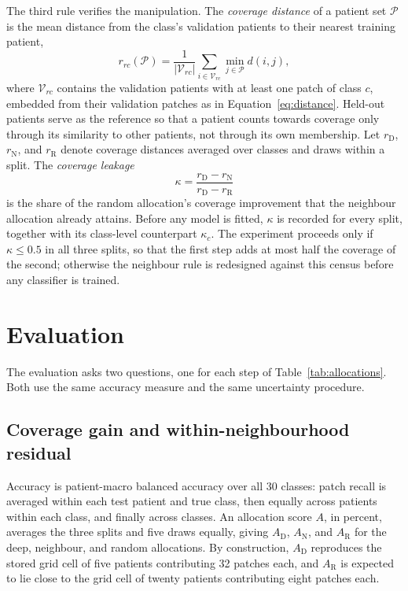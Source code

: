 \documentclass[11pt]{article}
\begin{document}
The third rule verifies the manipulation. The \emph{coverage distance} of a patient set $\mathcal P$ is the mean distance from the class's validation patients to their nearest training patient,
\begin{equation}
 r_{rc}(\mathcal P)=\frac{1}{|\mathcal V_{rc}|}\sum_{i\in\mathcal V_{rc}}\min_{j\in\mathcal P}d(i,j),
 \label{eq:coverage}
\end{equation}
\noindent where $\mathcal V_{rc}$ contains the validation patients with at least one patch of class $c$, embedded from their validation patches as in Equation~\eqref{eq:distance}. Held-out patients serve as the reference so that a patient counts towards coverage only through its similarity to other patients, not through its own membership. Let $r_{\mathrm D}$, $r_{\mathrm N}$, and $r_{\mathrm R}$ denote coverage distances averaged over classes and draws within a split. The \emph{coverage leakage}
\begin{equation}
 \kappa=\frac{r_{\mathrm D}-r_{\mathrm N}}{r_{\mathrm D}-r_{\mathrm R}}
 \label{eq:leakage}
\end{equation}
\noindent is the share of the random allocation's coverage improvement that the neighbour allocation already attains. Before any model is fitted, $\kappa$ is recorded for every split, together with its class-level counterpart $\kappa_c$. The experiment proceeds only if $\kappa\le 0.5$ in all three splits, so that the first step adds at most half the coverage of the second; otherwise the neighbour rule is redesigned against this census before any classifier is trained.

\section{Evaluation}
\label{sec:evaluation}
The evaluation asks two questions, one for each step of Table~\ref{tab:allocations}. Both use the same accuracy measure and the same uncertainty procedure.

\subsection{Coverage gain and within-neighbourhood residual}
\label{sec:contrasts}
Accuracy is patient-macro balanced accuracy over all 30 classes: patch recall is averaged within each test patient and true class, then equally across patients within each class, and finally across classes. An allocation score $A$, in percent, averages the three splits and five draws equally, giving $A_{\mathrm D}$, $A_{\mathrm N}$, and $A_{\mathrm R}$ for the deep, neighbour, and random allocations. By construction, $A_{\mathrm D}$ reproduces the stored grid cell of five patients contributing 32 patches each, and $A_{\mathrm R}$ is expected to lie close to the grid cell of twenty patients contributing eight patches each.
\end{document}
